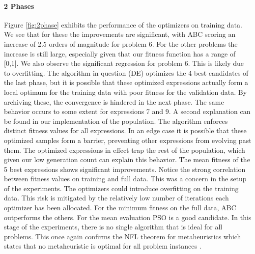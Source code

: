 \paragraph{2 Phases}
Figure \ref{fig:2phase} exhibits the performance of the optimizers on training data. 
We see that for these the improvements are significant, with ABC scoring an increase of 2.5 orders of magnitude for problem 6. For the other problems the increase is still large, especially given that our fitness function has a range of [0,1].
We also observe the significant regression for problem 6. This is likely due to overfitting. The algorithm in question (DE) optimizes the 4 best candidates of the last phase, but it is possible that these optimized expressions actually form a local optimum for the training data with poor fitness for the validation data. By archiving these, the convergence is hindered in the next phase. The same behavior occurs to some extent for expressions 7 and 9. A second explanation can be found in our implementation of the population. The algorithm enforces distinct fitness values for all expressions. In an edge case it is possible that these optimized samples form a barrier, preventing other expressions from evolving past them. The optimized expressions in effect trap the rest of the population, which given our low generation count can explain this behavior. The mean fitness of the 5 best expressions shows significant improvements. Notice the strong correlation between fitness values on training and full data. This was a concern in the setup of the experiments. The optimizers could introduce overfitting on the training data. This risk is mitigated by the relatively low number of iterations each optimizer has been allocated. For the minimum fitness on the full data, ABC outperforms the others. For the mean evaluation PSO is a good candidate. In this stage of the experiments, there is no single algorithm that is ideal for all problems. This once again confirms the NFL theorem for metaheuristics which states that no metaheuristic is optimal for all problem instances \cite{NFL}.
